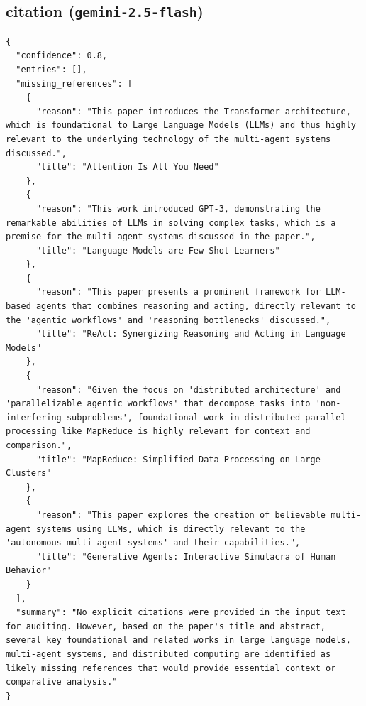 \documentclass[11pt]{article}
\begin{document}
\subsection*{citation (\texttt{gemini-2.5-flash})}
\begin{verbatim}
{
  "confidence": 0.8,
  "entries": [],
  "missing_references": [
    {
      "reason": "This paper introduces the Transformer architecture, which is foundational to Large Language Models (LLMs) and thus highly relevant to the underlying technology of the multi-agent systems discussed.",
      "title": "Attention Is All You Need"
    },
    {
      "reason": "This work introduced GPT-3, demonstrating the remarkable abilities of LLMs in solving complex tasks, which is a premise for the multi-agent systems discussed in the paper.",
      "title": "Language Models are Few-Shot Learners"
    },
    {
      "reason": "This paper presents a prominent framework for LLM-based agents that combines reasoning and acting, directly relevant to the 'agentic workflows' and 'reasoning bottlenecks' discussed.",
      "title": "ReAct: Synergizing Reasoning and Acting in Language Models"
    },
    {
      "reason": "Given the focus on 'distributed architecture' and 'parallelizable agentic workflows' that decompose tasks into 'non-interfering subproblems', foundational work in distributed parallel processing like MapReduce is highly relevant for context and comparison.",
      "title": "MapReduce: Simplified Data Processing on Large Clusters"
    },
    {
      "reason": "This paper explores the creation of believable multi-agent systems using LLMs, which is directly relevant to the 'autonomous multi-agent systems' and their capabilities.",
      "title": "Generative Agents: Interactive Simulacra of Human Behavior"
    }
  ],
  "summary": "No explicit citations were provided in the input text for auditing. However, based on the paper's title and abstract, several key foundational and related works in large language models, multi-agent systems, and distributed computing are identified as likely missing references that would provide essential context or comparative analysis."
}
\end{verbatim}
\end{document}
